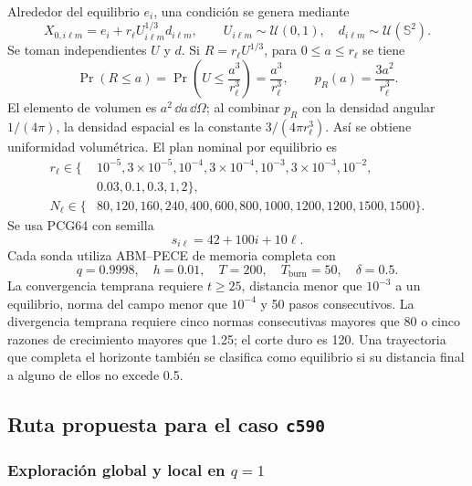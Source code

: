 Alrededor del equilibrio \(e_i\), una condición se genera mediante
\begin{equation}
X_{0,i\ell m}
=e_i+r_\ell U_{i\ell m}^{1/3}d_{i\ell m},
\qquad
U_{i\ell m}\sim\mathcal U(0,1),\quad
d_{i\ell m}\sim\mathcal U(\mathbb S^2).
\label{eq:muestreo_bola}
\end{equation}
Se toman independientes \(U\) y \(d\). Si \(R=r_\ell U^{1/3}\), para
\(0\leq a\leq r_\ell\) se tiene
\[
 \Pr(R\leq a)=\Pr\!\left(U\leq\frac{a^3}{r_\ell^3}\right)
 =\frac{a^3}{r_\ell^3},\qquad
 p_R(a)=\frac{3a^2}{r_\ell^3}.
\]
El elemento de volumen es \(a^2\,\dd a\,\dd\Omega\); al combinar
\(p_R\) con la densidad angular \(1/(4\pi)\), la densidad espacial es la
constante \(3/(4\pi r_\ell^3)\). Así se obtiene uniformidad volumétrica.
El plan nominal por equilibrio es
\begin{equation}
\begin{aligned}
r_\ell\in\{&
10^{-5},3{\times}10^{-5},10^{-4},3{\times}10^{-4},
10^{-3},3{\times}10^{-3},10^{-2},\\
&0.03,0.1,0.3,1,2\},\\
N_\ell\in\{&
80,120,160,240,400,600,800,1000,1200,1200,1500,1500\}.
\end{aligned}
\label{eq:plan_bolas_no_suave}
\end{equation}
Se usa PCG64 con semilla
\[
s_{i\ell}=42+100i+10\ell .
\]
Cada sonda utiliza ABM--PECE de memoria completa con
\[
q=0.9998,\quad h=0.01,\quad T=200,\quad
T_{\mathrm{burn}}=50,\quad\delta=0.5.
\]
La convergencia temprana requiere \(t\geq25\), distancia menor que
\(10^{-3}\) a un equilibrio, norma del campo menor que \(10^{-4}\) y 50 pasos
consecutivos. La divergencia temprana requiere cinco normas consecutivas
mayores que 80 o cinco razones de crecimiento mayores que 1.25; el corte duro
es 120. Una trayectoria que completa el horizonte también se clasifica como
equilibrio si su distancia final a alguno de ellos no excede 0.5.

\subsection{Ruta propuesta para el caso \texttt{c590}}
\label{subsec:protocolo_c590}

\subsubsection{Exploración global y local en
\texorpdfstring{\(q=1\)}{q=1}}

